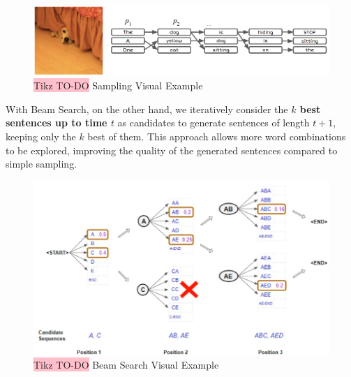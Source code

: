 \begin{figure}[!htbp]
    \centering
    \includegraphics[width=\linewidth]{tikz/chapter7 - Sampling.png}
    \caption{{\color{red}\colorbox{pink}{Tikz TO-DO}} Sampling Visual Example}
\end{figure}

With Beam Search, on the other hand, we iteratively consider the \textbf{$k$ best sentences up to time $t$} as candidates to generate sentences of length $t+1$, keeping only the $k$ best of them. This approach allows more word combinations to be explored, improving the quality of the generated sentences compared to simple sampling.

\begin{figure}[!htbp]
    \centering
    \includegraphics[width=\linewidth]{tikz/chapter7 - Beam Search.png}
    \caption{{\color{red}\colorbox{pink}{Tikz TO-DO}} Beam Search Visual Example}
\end{figure}

